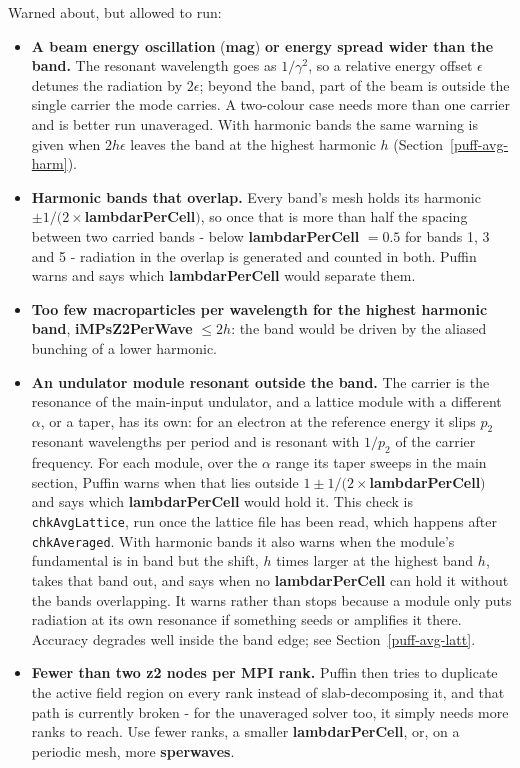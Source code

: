 \documentclass[12pt]{article}%
\begin{document}
Warned about, but allowed to run:

\begin{itemize}

\item {\bf A beam energy oscillation} ({\bf mag}) {\bf or energy spread wider than the band.} The resonant wavelength goes as $1/\gamma^2$, so a relative energy offset $\epsilon$ detunes the radiation by $2\epsilon$; beyond the band, part of the beam is outside the single carrier the mode carries. A two-colour case needs more than one carrier and is better run unaveraged. With harmonic bands the same warning is given when $2h\epsilon$ leaves the band at the highest harmonic $h$ (Section~\ref{puff-avg-harm}).

\item {\bf Harmonic bands that overlap.} Every band's mesh holds its harmonic $\pm 1/(2\times${\bf lambdarPerCell}$)$, so once that is more than half the spacing between two carried bands - below {\bf lambdarPerCell} $= 0.5$ for bands 1, 3 and 5 - radiation in the overlap is generated and counted in both. Puffin warns and says which {\bf lambdarPerCell} would separate them.

\item {\bf Too few macroparticles per wavelength for the highest harmonic band}, {\bf iMPsZ2PerWave} $\le 2h$: the band would be driven by the aliased bunching of a lower harmonic.

\item {\bf An undulator module resonant outside the band.} The carrier is the resonance of the main-input undulator, and a lattice module with a different $\alpha$, or a taper, has its own: for an electron at the reference energy it slips $p_2$ resonant wavelengths per period and is resonant with $1/p_2$ of the carrier frequency. For each module, over the $\alpha$ range its taper sweeps in the main section, Puffin warns when that lies outside $1 \pm 1/(2\times${\bf lambdarPerCell}$)$ and says which {\bf lambdarPerCell} would hold it. This check is {\tt chkAvgLattice}, run once the lattice file has been read, which happens after {\tt chkAveraged}. With harmonic bands it also warns when the module's fundamental is in band but the shift, $h$ times larger at the highest band $h$, takes that band out, and says when no {\bf lambdarPerCell} can hold it without the bands overlapping. It warns rather than stops because a module only puts radiation at its own resonance if something seeds or amplifies it there. Accuracy degrades well inside the band edge; see Section~\ref{puff-avg-latt}.

\item {\bf Fewer than two z2 nodes per MPI rank.} Puffin then tries to duplicate the active field region on every rank instead of slab-decomposing it, and that path is currently broken - for the unaveraged solver too, it simply needs more ranks to reach. Use fewer ranks, a smaller {\bf lambdarPerCell}, or, on a periodic mesh, more {\bf sperwaves}.

\end{itemize}
\end{document}

